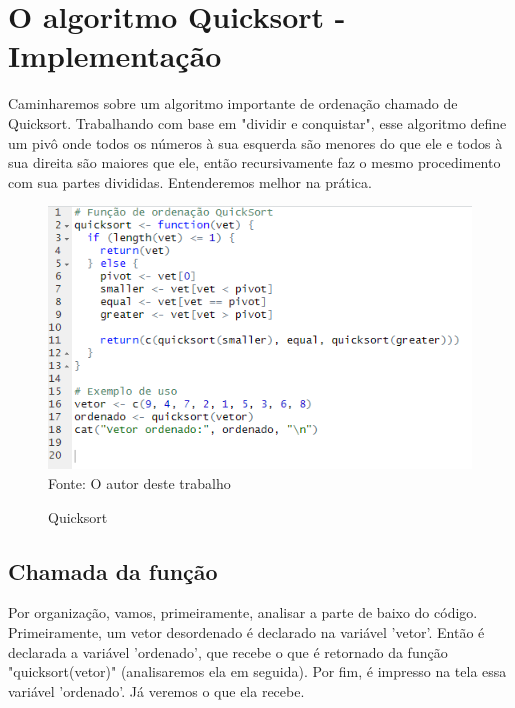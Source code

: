     \section{O algoritmo Quicksort - Implementa\c{c}\~{a}o}
    Caminharemos sobre um algoritmo importante de ordenação chamado de Quicksort. Trabalhando com base em "dividir e conquistar", esse algoritmo define um pivô onde todos os números à sua esquerda são menores do que ele e todos à sua direita são maiores que ele, então recursivamente faz o mesmo procedimento com sua partes divididas. Entenderemos melhor na prática. 
   \begin{figure}[H]
   		\centering
   		\caption{Quicksort}
   		\includegraphics[width=1.0\linewidth]{Prints/screenshot023}
   		\label{fig:screenshot023}
   		{\tiny \sf Fonte: O autor deste trabalho }
   \end{figure}
   \subsection{Chamada da função}
   Por organização, vamos, primeiramente, analisar a parte de baixo do código. Primeiramente, um vetor desordenado é declarado na variável 'vetor'. Então é declarada a variável 'ordenado', que recebe o que é retornado da função "quicksort(vetor)" (analisaremos ela em seguida). Por fim, é impresso na tela essa variável 'ordenado'. Já veremos o que ela recebe.
